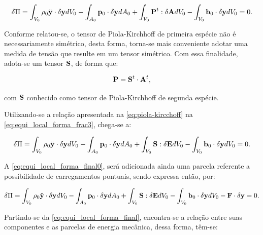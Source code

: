 \begin{align}
\delta\Pi = \int_{V_{0}} \rho_{0} \ddot{\mathbf{y}} \cdot \delta\mathbf{y} dV_{0} - \int_{A_{0}} \mathbf{p}_{0} \cdot \delta\mathbf{y} dA_{0} + \int_{V_{0}} \mathbf{P}^{t} : \delta\mathbf{A} dV_{0} - \int_{V_{0}}  \mathbf{b}_0 \cdot \delta\mathbf{y} dV_{0} = 0. \label{eq:equi_local_forma_frac3}
\end{align}

Conforme relatou-se, o tensor de Piola-Kirchhoff de primeira espécie não é necessariamente simétrico, desta forma, torna-se mais conveniente adotar uma medida de tensão que resulte em um tensor simétrico. Com essa finalidade, adota-se um tensor $\mathbf{S}$, de forma que:

\begin{align}
\mathbf{P} = \mathbf{S}^{t} \cdot \mathbf{A}^{t}, \label{eq:piola-kircchoff}
\end{align}

\noindent com $\mathbf{S}$ conhecido como tensor de Piola-Kirchhoff de segunda espécie. 

Utilizando-se a relação apresentada na \autoref{eq:piola-kircchoff} na \autoref{eq:equi_local_forma_frac3}, chega-se a:

\begin{align}
\delta\Pi = \int_{V_{0}} \rho_{0} \ddot{\mathbf{y}} \cdot \delta\mathbf{y} dV_{0} - \int_{A_{0}} \mathbf{p}_{0} \cdot \delta\mathbf{y} dA_{0} +  \int_{V_{0}} \mathbf{S} : \delta\mathbf{E} dV_{0} - \int_{V_{0}}  \mathbf{b}_0 \cdot \delta\mathbf{y} dV_{0} = 0.
\label{eq:equi_local_forma_final0}
\end{align}

A \autoref{eq:equi_local_forma_final0}, será adicionada ainda uma parcela referente a possibilidade de carregamentos pontuais, sendo expressa então, por:

\begin{align}
	\delta\Pi = \int_{V_{0}} \rho_{0} \ddot{\mathbf{y}} \cdot \delta\mathbf{y} dV_{0} - \int_{A_{0}} \mathbf{p}_{0} \cdot \delta\mathbf{y} dA_{0} +  \int_{V_{0}} \mathbf{S} : \delta\mathbf{E} dV_{0} - \int_{V_{0}}  \mathbf{b}_0 \cdot \delta\mathbf{y} dV_{0} - \mathbf{F} \cdot \delta\mathbf{y} = 0.
	\label{eq:equi_local_forma_final}
\end{align}

Partindo-se da \autoref{eq:equi_local_forma_final}, encontra-se a relação entre suas componentes e as parcelas de energia mecânica, dessa forma, têm-se:

